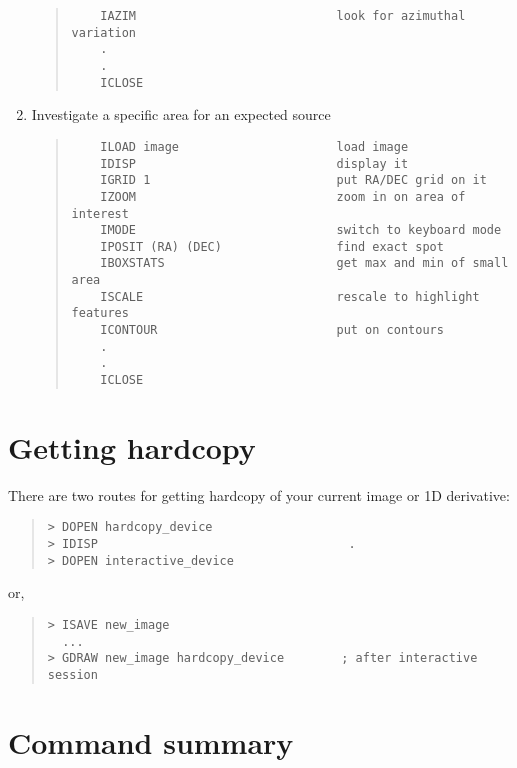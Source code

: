 \documentclass{book}
\renewcommand{\_}{{\tt\char'137}}     %
\begin{document}
\begin{enumerate}
\begin{quote}
\begin{verbatim}
    IAZIM                            look for azimuthal variation
    .
    .
    ICLOSE
\end{verbatim}\end{quote}
\item Investigate a specific area for an expected source
\begin{quote}\begin{verbatim}
    ILOAD image                      load image
    IDISP                            display it
    IGRID 1                          put RA/DEC grid on it
    IZOOM                            zoom in on area of interest
    IMODE                            switch to keyboard mode
    IPOSIT (RA) (DEC)                find exact spot
    IBOXSTATS                        get max and min of small area
    ISCALE                           rescale to highlight features
    ICONTOUR                         put on contours
    .
    .
    ICLOSE
\end{verbatim}\end{quote}
\end{enumerate}
\section{Getting hardcopy}
There are two routes for getting hardcopy of your current image
or 1D derivative:
 
\begin{quote}\begin{verbatim}
> DOPEN hardcopy_device
> IDISP                                   .
> DOPEN interactive_device
\end{verbatim}\end{quote}
or,
\begin{quote}\begin{verbatim}
> ISAVE new_image
  ...
> GDRAW new_image hardcopy_device        ; after interactive session
\end{verbatim}\end{quote}
\section{Command summary}
 
\end{document}

